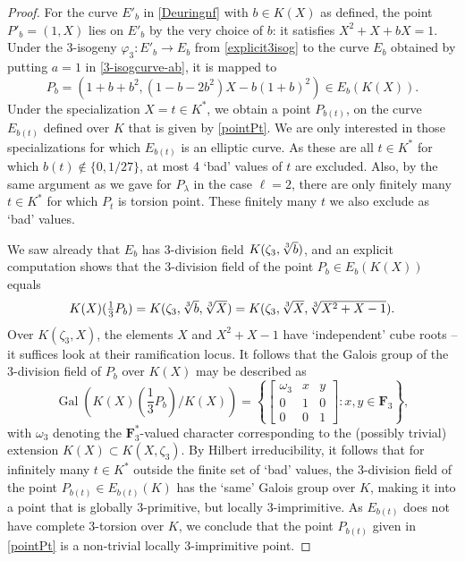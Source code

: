 \documentclass[10pt,a4paper]{amsart}
\DeclareMathOperator{\Gal}{Gal}
\newcommand{\FF}{{\mathbf{F}}}
\begin{document}
\begin{proof}
For the curve $E'_b$ in \eqref{Deuringnf} with $b\in K(X)$ as defined, 
the point $P'_b=(1, X)$ lies on $E'_b$ by the very choice of $b$:
it satisfies $X^2+X+bX=1$.
Under the 3-isogeny $\varphi_3: E'_b\to E_b$ from 
\eqref{explicit3isog} to the curve
$E_b$ obtained by putting $a=1$ in \eqref{3-isogcurve-ab},
it is mapped to 
$$
P_b=(1+b+b^2, (1-b-2b^2)X-b(1+b)^2)\in E_b(K(X)).
$$
Under the specialization $X=t\in K^*$, we obtain a point $P_{b(t)}$,
on the curve $E_{b(t)}$ defined over $K$ 
that is given by \eqref{pointPt}.
We are only interested in those 
specializations for which $E_{b(t)}$ is an elliptic curve.
As these are all $t\in K^*$ for which $b(t)\notin \{0, 1/27\}$, at most
4 `bad' values of $t$ are excluded.
Also, by the same argument as we gave for $P_\lambda$ in the case $\ell=2$,
there are only finitely many $t\in K^*$ for which $P_t$ is torsion point. 
These finitely many $t$ we also exclude as `bad' values.

We saw already that $E_b$ has 3-division field 
$K(\zeta_3, \root 3 \of b)$, and an explicit computation 
shows that the 3-division field of the point $P_b\in E_b(K(X))$ equals 
\[
K(X)(\textstyle\frac13 P_b)=K(\zeta_3, \root 3 \of b, \root 3 \of X)=
K(\zeta_3, \root 3 \of X, \root 3 \of {X^2+X-1}).
\]
Over $K(\zeta_3, X)$, the elements $X$ and $X^2+X-1$ have 
`independent' cube roots -- it suffices look at their ramification locus.
It follows that the Galois group of 
the 3-division field of $P_b$ over $K(X)$
may be described as
\[
\Gal(K(X)(\textstyle\frac13 P_b)/K(X))= 
\left\{ \begin{bmatrix}
\omega_3 & x & y \\
0 & 1 & 0 \\
0 & 0 & 1 
\end{bmatrix}: x,y\in\FF_3  \right\},
\]
with $\omega_3$ denoting the $\FF_3^*$-valued character corresponding to
the (possibly trivial) extension $K(X)\subset K(X, \zeta_3)$.
By Hilbert irreducibility, it follows that for infinitely many
$t\in K^*$ outside the finite set of `bad' values, 
the 3-division field of the point $P_{b(t)}\in E_{b(t)}(K)$ 
has the `same' Galois group over $K$,
making it into a point that is globally 3-primitive, but locally $3$-imprimitive.
As $E_{b(t)}$ does not have complete 3-torsion over $K$, we conclude that the point $P_{b(t)}$ given in \eqref{pointPt}
is a non-trivial locally 3-imprimitive point.
\end{proof}
\end{document}
